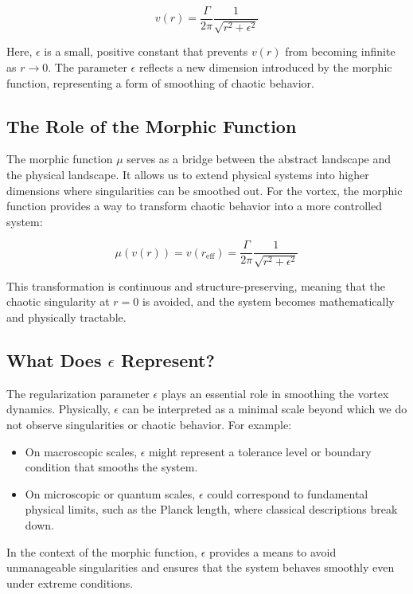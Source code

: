 \documentclass{article}
\begin{document}
\[
v(r) = \frac{\Gamma}{2\pi} \frac{1}{\sqrt{r^2 + \epsilon^2}}
\]

Here, \( \epsilon \) is a small, positive constant that prevents \( v(r) \) from becoming infinite as \( r \to 0 \). The parameter \( \epsilon \) reflects a new dimension introduced by the morphic function, representing a form of smoothing of chaotic behavior.

\subsection*{The Role of the Morphic Function}

The morphic function \( \mu \) serves as a bridge between the abstract landscape and the physical landscape. It allows us to extend physical systems into higher dimensions where singularities can be smoothed out. For the vortex, the morphic function provides a way to transform chaotic behavior into a more controlled system:

\[
\mu(v(r)) = v(r_{\text{eff}}) = \frac{\Gamma}{2\pi} \frac{1}{\sqrt{r^2 + \epsilon^2}}
\]

This transformation is continuous and structure-preserving, meaning that the chaotic singularity at \( r = 0 \) is avoided, and the system becomes mathematically and physically tractable.

\subsection*{What Does \( \epsilon \) Represent?}

The regularization parameter \( \epsilon \) plays an essential role in smoothing the vortex dynamics. Physically, \( \epsilon \) can be interpreted as a minimal scale beyond which we do not observe singularities or chaotic behavior. For example:
\begin{itemize}
    \item On macroscopic scales, \( \epsilon \) might represent a tolerance level or boundary condition that smooths the system.
    \item On microscopic or quantum scales, \( \epsilon \) could correspond to fundamental physical limits, such as the Planck length, where classical descriptions break down.
\end{itemize}

In the context of the morphic function, \( \epsilon \) provides a means to avoid unmanageable singularities and ensures that the system behaves smoothly even under extreme conditions.
\end{document}
